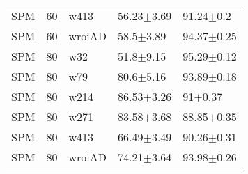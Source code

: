 \begin{table}[ht]
\begin{center}
\begin{tabular}{lllll}
  SPM & 60 & w413 & 56.23$\pm$3.69 & 91.24$\pm$0.2 \\ 
  SPM & 60 & wroiAD & 58.5$\pm$3.89 & 94.37$\pm$0.25 \\ 
  SPM & 80 & w32 & 51.8$\pm$9.15 & 95.29$\pm$0.12 \\ 
  SPM & 80 & w79 & 80.6$\pm$5.16 & 93.89$\pm$0.18 \\ 
  SPM & 80 & w214 & 86.53$\pm$3.26 & 91$\pm$0.37 \\ 
  SPM & 80 & w271 & 83.58$\pm$3.68 & 88.85$\pm$0.35 \\ 
  SPM & 80 & w413 & 66.49$\pm$3.49 & 90.26$\pm$0.31 \\ 
  SPM & 80 & wroiAD & 74.21$\pm$3.64 & 93.98$\pm$0.26 \\ 
   \hline
\end{tabular}
\end{center}
\end{table}
